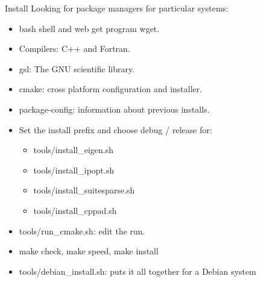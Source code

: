\documentclass{beamer}
\begin{document}
\begin{frame}{Install}
Looking for package managers for particular systems:
\pause

\begin{itemize}

\item
bash shell and web get program wget.
\pause

\item
Compilers: C++ and Fortran.
\pause

\item
gsl: The GNU scientific library.
\pause

\item
cmake: cross platform configuration and installer.
\pause

\item
package-config: information about previous installs.
\pause

\item
Set the install prefix and choose debug / release for:
\pause

\begin{itemize}
\item
tools/install\_eigen.sh
\pause
\item
tools/install\_ipopt.sh
\pause
\item
tools/install\_suitesparse.sh
\pause
\item
tools/install\_cppad.sh
\pause
\end{itemize}

\item
tools/run\_cmake.sh: edit the run.
\pause

\item
make check, make speed, make install
\pause

\item
tools/debian\_install.sh: puts it all together for a Debian system
\pause

\end{itemize}
\end{frame}
\end{document}
